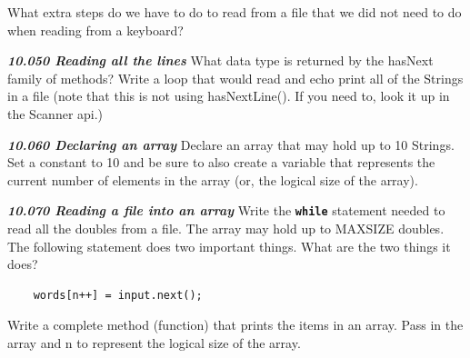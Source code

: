 \documentclass[letterpaper,11pt]{exam}
\newcommand{\videoheading}[1]{\Large\textbf{\textit{#1}}}
\begin{document}
\begin{questions}
\question What extra steps do we have to do to read from a file that we did not need to do when reading from a keyboard?
\vspace{4cm}

\videoheading{10.050 Reading all the lines}
\question What data type is returned by the hasNext family of methods?
\question Write a loop that would read and echo print all of the Strings in a file (note that this is not using hasNextLine().  If you need to, look it up in the Scanner api.)
\vspace{4cm}

\videoheading{10.060 Declaring an array}
\question Declare an array that may hold up to 10 Strings.  Set a constant to 10 and be sure to also create a variable that represents the current number of elements in the array (or, the logical size of the array).
\vspace{2cm}

\videoheading{10.070 Reading a file into an array}
\question Write the \texttt{\textbf{while}} statement needed to read all the doubles from a file. The array may hold up to MAXSIZE doubles.
\question The following statement does two important things.  What are the two things it does?
\begin{verbatim}
    words[n++] = input.next();
\end{verbatim}

\question Write a complete method (function) that prints the items in an array.  Pass in the array and n to represent the logical size of the array.
\end{questions}
\end{document}
